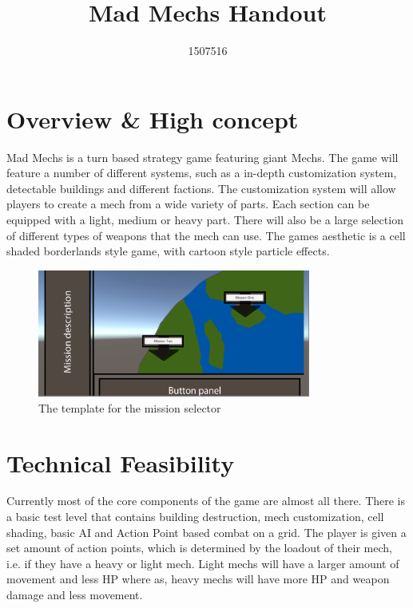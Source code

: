 \documentclass{tufte-handout}
\title{Mad Mechs Handout}
\author{1507516}
\begin{document}
\maketitle


\section{Overview \& High concept}
Mad Mechs is a turn based strategy game featuring giant Mechs.
The game will feature a number of different systems, such as a in-depth customization system, detectable buildings and different factions.
The customization system will allow players to create a mech from a wide variety of parts. Each section can be equipped with a light, medium or heavy part. There will also be a large selection of different types of weapons that the mech can use.
The games aesthetic is a cell shaded borderlands style game, with cartoon style particle effects. 

\begin{figure}[h]
	\caption{The template for the mission selector}
	\centering
	\includegraphics[width=0.8\textwidth]{MissionSelect}
\end{figure}

\section{Technical Feasibility}
Currently most of the core components of the game are almost all there. There is a basic test level that contains building destruction, mech customization, cell shading, basic AI and Action Point based combat on a grid. 
The player is given a set amount of action points, which is determined by the loadout of their mech, i.e. if they have a heavy or light mech. Light mechs will have a larger amount of movement and less HP where as, heavy mechs will have more HP and weapon damage and less movement.
\end{document}
